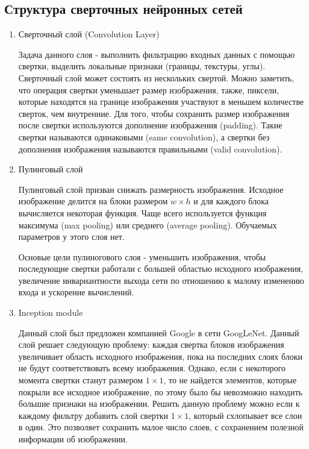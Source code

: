 {\subsection{Структура сверточных нейронных сетей}

\begin{enumerate}
    \item Сверточный слой (Convolution Layer)

          Задача данного слоя - выполнить фильтрацию входных данных с помощью свертки, выделить локальные
          признаки (границы, текстуры, углы). Сверточный слой может состоять из нескольких свертой. Можно
          заметить, что операция свертки уменьшает размер изображения, также, пиксели, которые находятся на
          границе изображения участвуют в меньшем количестве сверток, чем внутренние. Для того, чтобы
          сохранить размер изображения после свертки используются дополнение изображения (padding). Такие
          свертки называются одинаковыми (same convolution), а свертки без дополнения изображения
          называются правильными (valid convolution).

    \item Пулинговый слой

          Пулинговый слой призван снижать размерность изображения. Исходное изображение делится на блоки
          размером \(w \times h\) и для каждого блока вычисляется некоторая функция. Чаще всего используется
          функция максимума (max pooling) или среднего (average pooling). Обучаемых параметров у этого слоя
          нет.

          Основые цели пулиногового слоя - уменьшить изображения, чтобы последующие свертки работали с
          большей областью исходного изображения, увеличение инвариантности выхода сети по отношению к
          малому изменению входа и ускорение вычислений.

    \item Inception module

          Данный слой был предложен компанией Google в сети GoogLeNet. Данный слой решает следующую
          проблему: каждая свертка блоков изображения увеличивает область исходного изображения, пока на
          последних слоях блоки не будут соответствовать всему изображения. Однако, если с некоторого
          момента свертки станут размером \(1 \times 1\), то не найдется элементов, которые покрыли все
          исходное изображение, по этому было бы невозможно находить большие признаки на
          изображении. Решить данную проблему можно если к каждому фильтру добавить слой свертки \(1 \times
          1\), который схлопывает все слои в один. Это позволяет сохранить малое число слоев, с сохранением
          полезной информации об изображении.


\end{enumerate}}
